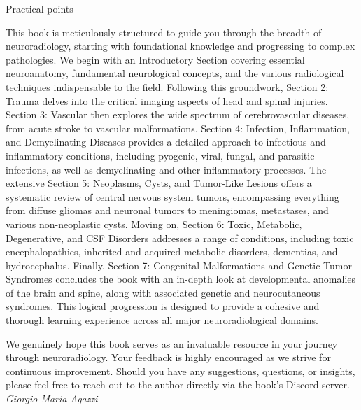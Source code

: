 \begin{tcolorbox}[colback=purple!5!white,colframe=purple!75!white,title=Practical points]
	Practical points
\end{tcolorbox}

This book is meticulously structured to guide you through the breadth of neuroradiology, starting with foundational knowledge and progressing to complex pathologies. We begin with an Introductory Section covering essential neuroanatomy, fundamental neurological concepts, and the various radiological techniques indispensable to the field. Following this groundwork, Section 2: Trauma delves into the critical imaging aspects of head and spinal injuries. Section 3: Vascular then explores the wide spectrum of cerebrovascular diseases, from acute stroke to vascular malformations. Section 4: Infection, Inflammation, and Demyelinating Diseases provides a detailed approach to infectious and inflammatory conditions, including pyogenic, viral, fungal, and parasitic infections, as well as demyelinating and other inflammatory processes. The extensive Section 5: Neoplasms, Cysts, and Tumor-Like Lesions offers a systematic review of central nervous system tumors, encompassing everything from diffuse gliomas and neuronal tumors to meningiomas, metastases, and various non-neoplastic cysts. Moving on, Section 6: Toxic, Metabolic, Degenerative, and CSF Disorders addresses a range of conditions, including toxic encephalopathies, inherited and acquired metabolic disorders, dementias, and hydrocephalus. Finally, Section 7: Congenital Malformations and Genetic Tumor Syndromes concludes the book with an in-depth look at developmental anomalies of the brain and spine, along with associated genetic and neurocutaneous syndromes. This logical progression is designed to provide a cohesive and thorough learning experience across all major neuroradiological domains.

We genuinely hope this book serves as an invaluable resource in your journey through neuroradiology. Your feedback is highly encouraged as we strive for continuous improvement. Should you have any suggestions, questions, or insights, please feel free to reach out to the author directly via the book's Discord server.
\newline
\textit{Giorgio Maria Agazzi}
